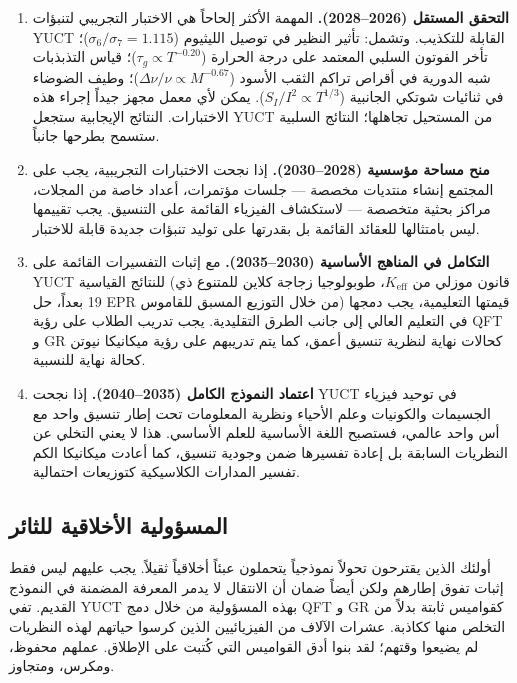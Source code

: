 \documentclass[12pt,a4paper]{article}
\begin{document}
	\begin{enumerate}
		\item \textbf{التحقق المستقل (2026–2028).} المهمة الأكثر إلحاحاً هي الاختبار التجريبي لتنبؤات YUCT القابلة للتكذيب. وتشمل: تأثير النظير في توصيل الليثيوم (\(\sigma_6/\sigma_7 = 1.115\))؛ تأخر الفوتون السلبي المعتمد على درجة الحرارة (\(\tau_g \propto T^{-0.20}\))؛ قياس التذبذبات شبه الدورية في أقراص تراكم الثقب الأسود (\(\Delta\nu/\nu \propto M^{-0.67}\))؛ وطيف الضوضاء في ثنائيات شوتكي الجانبية (\(S_I/I^2 \propto T^{1/3}\)). يمكن لأي معمل مجهز جيداً إجراء هذه الاختبارات. النتائج الإيجابية ستجعل YUCT من المستحيل تجاهلها؛ النتائج السلبية ستسمح بطرحها جانباً.
		
		\item \textbf{منح مساحة مؤسسية (2028–2030).} إذا نجحت الاختبارات التجريبية، يجب على المجتمع إنشاء منتديات مخصصة — جلسات مؤتمرات، أعداد خاصة من المجلات، مراكز بحثية متخصصة — لاستكشاف الفيزياء القائمة على التنسيق. يجب تقييمها ليس بامتثالها للعقائد القائمة بل بقدرتها على توليد تنبؤات جديدة قابلة للاختبار.
		
		\item \textbf{التكامل في المناهج الأساسية (2030–2035).} مع إثبات التفسيرات القائمة على YUCT للنتائج القياسية (قانون موزلي من \(K_{\mathrm{eff}}\)، طوبولوجيا زجاجة كلاين للمتنوع ذي 19 بعداً، حل EPR من خلال التوزيع المسبق للقاموس) قيمتها التعليمية، يجب دمجها في التعليم العالي إلى جانب الطرق التقليدية. يجب تدريب الطلاب على رؤية QFT و GR كحالات نهاية لنظرية تنسيق أعمق، كما يتم تدريبهم على رؤية ميكانيكا نيوتن كحالة نهاية للنسبية.
		
		\item \textbf{اعتماد النموذج الكامل (2035–2040).} إذا نجحت YUCT في توحيد فيزياء الجسيمات والكونيات وعلم الأحياء ونظرية المعلومات تحت إطار تنسيق واحد مع أس واحد عالمي، فستصبح اللغة الأساسية للعلم الأساسي. هذا لا يعني التخلي عن النظريات السابقة بل إعادة تفسيرها ضمن وجودية تنسيق، كما أعادت ميكانيكا الكم تفسير المدارات الكلاسيكية كتوزيعات احتمالية.
	\end{enumerate}
	
	\subsection{المسؤولية الأخلاقية للثائر}
	
	أولئك الذين يقترحون تحولاً نموذجياً يتحملون عبئاً أخلاقياً ثقيلاً. يجب عليهم ليس فقط إثبات تفوق إطارهم ولكن أيضاً ضمان أن الانتقال لا يدمر المعرفة المضمنة في النموذج القديم. تفي YUCT بهذه المسؤولية من خلال دمج QFT و GR كقواميس ثابتة بدلاً من التخلص منها ككاذبة. عشرات الآلاف من الفيزيائيين الذين كرسوا حياتهم لهذه النظريات لم يضيعوا وقتهم؛ لقد بنوا أدق القواميس التي كُتبت على الإطلاق. عملهم محفوظ، ومكرس، ومتجاوز.
	
\end{document}
